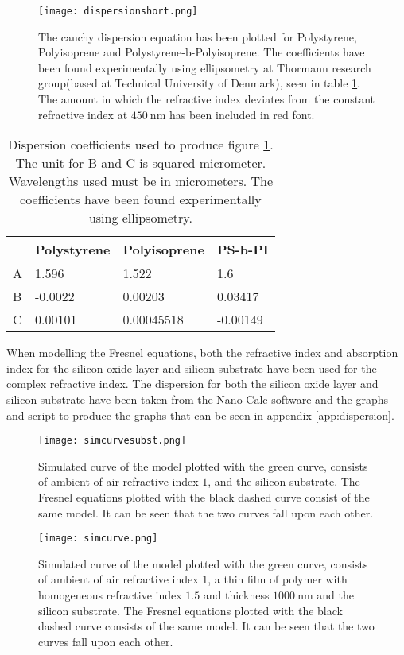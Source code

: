 \documentclass[MasterThesisMain.tex]{subfiles}
\begin{document}
\begin{figure}[H]
\centering
\texttt{[image: dispersionshort.png]}
\caption{The cauchy dispersion equation has been plotted for Polystyrene, Polyisoprene and Polystyrene-b-Polyisoprene. The coefficients have been found experimentally using ellipsometry at Thormann research group(based at Technical University of Denmark), seen in table \ref{tab:disco}. The amount in which the refractive index deviates from the constant refractive index at $\SI{450}{\nano\meter}$ has been included in red font.}
\label{fig:dispshort}
\end{figure} 

\begin{table}[H]
\centering
\begin{tabular}{|l|l|l|l|}
\hline
  & Polystyrene & Polyisoprene & PS-b-PI  \\ \hline
A & 1.596       & 1.522        & 1.6      \\ \hline
B & -0.0022     & 0.00203      & 0.03417  \\ \hline
C & 0.00101     & 0.00045518   & -0.00149 \\ \hline
\end{tabular}
\caption{Dispersion coefficients used to produce figure \ref{fig:dispshort}. The unit for B and C is squared micrometer. Wavelengths used must be in micrometers. The coefficients have been found experimentally using ellipsometry.}
\label{tab:disco}
\end{table}

When modelling the Fresnel equations, both the refractive index and absorption index for the silicon oxide layer and silicon substrate have been used for the complex refractive index. The dispersion for both the silicon oxide layer and silicon substrate have been taken from the Nano-Calc software and the graphs and script to produce the graphs that can be seen in appendix \ref{app:dispersion}.  

\begin{figure}[H]
\centering
\texttt{[image: simcurvesubst.png]}
\caption{Simulated curve of the model plotted with the green curve, consists of ambient of air refractive index $1$, and the silicon substrate. The Fresnel equations plotted with the black dashed curve consist of the same model. It can be seen that the two curves fall upon each other.}
\label{fig:simmodelsubst}
\end{figure}

\begin{figure}[H]
\centering
\texttt{[image: simcurve.png]}
\caption{Simulated curve of the model plotted with the green curve, consists of ambient of air refractive index $1$, a thin film of polymer with homogeneous refractive index $1.5$ and thickness $\SI{1000}{\nano\meter}$ and the silicon substrate. The Fresnel equations plotted with the black dashed curve consists of the same model. It can be seen that the two curves fall upon each other.}
\label{fig:simmodel1}
\end{figure}
\end{document}
